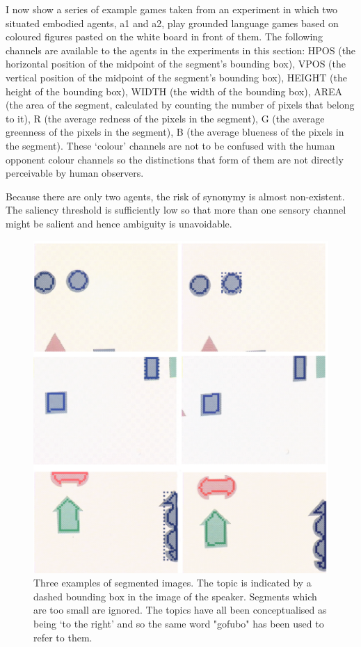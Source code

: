 I now show a series of example games taken from 
an experiment in which two situated embodied agents,
{\bfshape a1} and {\bfshape a2}, play grounded language games based on 
coloured figures pasted on the white board in front
of them. The following channels are available to the agents 
in the experiments in this section: 
HPOS (the horizontal position of the midpoint 
of the segment's bounding box), 
VPOS (the vertical position of the midpoint of the segment's 
bounding box), HEIGHT (the height of the bounding box), 
WIDTH (the width of the bounding box), AREA
(the area of the segment, calculated
by counting the number of pixels that belong to it), 
R (the average redness of the pixels in the segment), 
G (the average greenness of the pixels in the segment), 
B (the average blueness of the pixels in the segment). 
These `colour' channels are not to be confused with the 
human opponent colour channels so the distinctions 
that form of them are not directly perceivable by 
human observers.

Because there are only two agents, the 
risk of synonymy is almost non-existent. The saliency 
threshold is sufficiently low so that more than one
sensory channel might be salient and hence ambiguity
is unavoidable. 
\begin{figure}
\begin{center}
\includegraphics[width=0.8\columnwidth]{chap7/figs/plate-10}
\end{center}
\caption{ \footnotesize Three examples of segmented images. The 
topic is indicated by a dashed bounding box in the 
image of the speaker. Segments which are too small 
are ignored. The topics have all been conceptualised
as being `to the right' and so the same word 
"gofubo" has been used to refer to them. }
\label{fig:plate-10}
\end{figure}

